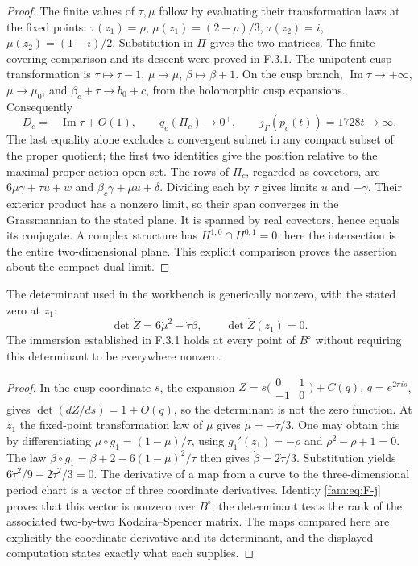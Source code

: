 \begin{proof}
The finite values of $\tau,\mu$ follow by evaluating their transformation
laws at the fixed points: $\tau(z_1)=\rho$,
$\mu(z_1)=(2-\rho)/3$, $\tau(z_2)=i$,
$\mu(z_2)=(1-i)/2$.  Substitution in $\Pi$ gives the two matrices.
The finite covering comparison and its descent were proved in F.3.1.
The unipotent cusp transformation is
$\tau\mapsto\tau-1$, $\mu\mapsto\mu$, $\beta\mapsto\beta+1$.
On the cusp branch, $\operatorname{Im}\tau\to+\infty$,
$\mu\to\mu_0$, and $\beta_c+\tau\to b_0+c$, from the holomorphic
cusp expansions.  Consequently
\[
 D_c=-\operatorname{Im}\tau+O(1),\qquad
 q_e(\Pi_c)\longrightarrow0^+,
 \qquad j_\Gamma(p_c(t))=1728t\longrightarrow\infty.
\]
The last equality alone excludes a convergent subnet in any compact
subset of the proper quotient; the first two identities give the
position relative to the maximal proper-action open set.
The rows of $\Pi_c$, regarded as covectors, are
$6\mu\gamma+\tau u+w$ and $\beta_c\gamma+\mu u+\delta$.
Dividing each by $\tau$ gives limits $u$ and $-\gamma$.
Their exterior product has a nonzero limit, so their span converges
in the Grassmannian to the stated plane.  It is spanned by real
covectors, hence equals its conjugate.  A complex structure has
$H^{1,0}\cap H^{0,1}=0$; here the intersection is the entire
two-dimensional plane.  This explicit comparison proves the assertion
about the compact-dual limit.
\end{proof}

\begin{proposition}\label{fam:src:F.3.3}\label{fam:st:F.3.3}
The determinant used in the workbench is generically nonzero, with
the stated zero at $z_1$:
\[
 \det\dot Z=6\dot\mu^2-\dot\tau\dot\beta,\qquad
 \det\dot Z(z_1)=0.
\]
The immersion established in F.3.1 holds at every point of $B^\circ$
without requiring this determinant to be everywhere nonzero.
\end{proposition}

\begin{proof}
In the cusp coordinate $s$, the expansion
$Z=s\bigl(\begin{smallmatrix}0&1\\-1&0\end{smallmatrix}\bigr)+C(q)$,
$q=e^{2\pi is}$, gives
$\det(dZ/ds)=1+O(q)$, so the determinant is not the zero function.
At $z_1$ the fixed-point transformation law of $\mu$ gives
$\dot\mu=-\dot\tau/3$.  One may obtain this by differentiating
$\mu\circ g_1=(1-\mu)/\tau$, using
$g_1'(z_1)=-\rho$ and $\rho^2-\rho+1=0$.
The law
$\beta\circ g_1=\beta+2-6(1-\mu)^2/\tau$ then gives
$\dot\beta=2\dot\tau/3$.  Substitution yields
$6\dot\tau^2/9-2\dot\tau^2/3=0$.
The derivative of a map from a curve to the three-dimensional period
chart is a vector of three coordinate derivatives.  Identity
\eqref{fam:eq:F-j} proves that this vector is nonzero over $B^\circ$;
the determinant tests the rank of the associated two-by-two
Kodaira--Spencer matrix.  The maps compared here are explicitly the
coordinate derivative and its determinant, and the displayed computation
states exactly what each supplies.
\end{proof}
